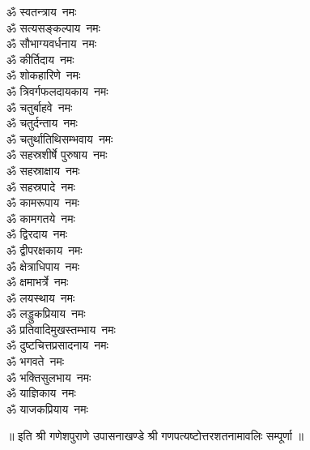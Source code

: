 \begin{multicols}{2}
\begin{flushleft}
ॐ स्वतन्त्राय~नमः\\
ॐ सत्यसङ्कल्पाय~नमः\\
ॐ सौभाग्यवर्धनाय~नमः\\
ॐ कीर्तिदाय~नमः\\
ॐ शोकहारिणे~नमः\\
ॐ त्रिवर्गफलदायकाय~नमः\\
ॐ चतुर्बाहवे~नमः\\
ॐ चतुर्दन्ताय~नमः\hfill{}\\
ॐ चतुर्थातिथिसम्भवाय~नमः\\
ॐ सहस्रशीर्षे पुरुषाय~नमः\\
ॐ सहस्राक्षाय~नमः\\
ॐ सहस्रपादे~नमः\\
ॐ कामरूपाय~नमः\\
ॐ कामगतये~नमः\\
ॐ द्विरदाय~नमः\\
ॐ द्वीपरक्षकाय~नमः\\
ॐ क्षेत्राधिपाय~नमः\\
ॐ क्षमाभर्त्रे~नमः\hfill{}\\
ॐ लयस्थाय~नमः\\
ॐ लड्डुकप्रियाय~नमः\\
ॐ प्रतिवादिमुखस्तम्भाय~नमः\\
ॐ दुष्टचित्तप्रसादनाय~नमः\\
ॐ भगवते~नमः\\
ॐ भक्तिसुलभाय~नमः\\
ॐ याज्ञिकाय~नमः\\
ॐ याजकप्रियाय~नमः\\
\end{flushleft}
\end{multicols}
\centerline{॥ इति श्री गणेशपुराणे उपासनाखण्डे श्री गणपत्यष्टोत्तरशतनामावलिः सम्पूर्णा ॥}
